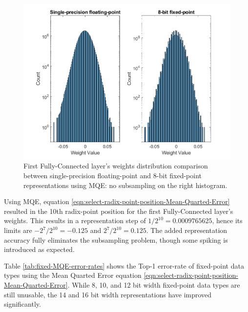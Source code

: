 \begin{figure} [H]
	\centering
	\includegraphics[scale=0.9]{Images/Weights-distributions/original-vs-fixed8/weight-distribution-FC1-MQE.png}
	\decoRule
	\caption[First Fully-Connected layer's weights distribution comparison between single-precision floating-point and 8-bit fixed-point representations using MQE]{First Fully-Connected layer's weights distribution comparison between single-precision floating-point and 8-bit fixed-point representations using MQE: no subsampling on the right histogram.}
	\label{fig:weight-distribution-comparison-FC1-MQE}
\end{figure}

Using MQE, equation \ref{eqn:select-radix-point-position-Mean-Quarted-Error} resulted in the 10th radix-point position for the first Fully-Connected layer's weights. This results in a representation step of $1/2^10 = 0.0009765625$, hence its limits are $-2^7/2^10 = -0.125$ and $2^7/2^10 = 0.125$. The added representation accuracy fully eliminates the subsampling problem, though some spiking is introduced as expected.

Table \ref{tab:fixed-MQE-error-rates} shows the Top-1 error-rate of fixed-point data types using the Mean Quarted Error equation \ref{eqn:select-radix-point-position-Mean-Quarted-Error}. While 8, 10, and 12 bit width fixed-point data types are still unusable, the 14 and 16 bit width representations have improved significantly.


